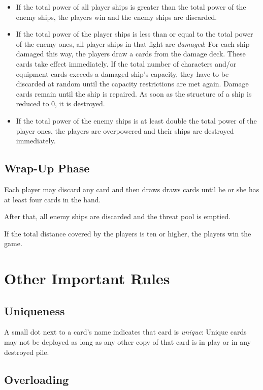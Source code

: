 \documentclass[11pt, a4paper]{article}
\begin{document}
\begin{itemize}
 \item If the total power of all player ships is greater than the total power of
the enemy ships, the players win and the enemy ships are discarded.
 \item If the total power of the player ships is less than or equal to the total
power of the enemy ones, all player ships in that fight are \emph{damaged}: For
each ship damaged this way, the players draw a cards from the damage deck.
These cards take effect immediately. If the total number of characters and/or
equipment cards exceeds a damaged ship's capacity, they have to be discarded at
random until the capacity restrictions are met again. Damage cards remain until
the ship is repaired. As soon as the structure of a ship is reduced to 0, it is
destroyed.
 \item If the total power of the enemy ships is at least double the total power
of the player ones, the players are overpowered and their ships are destroyed
immediately.
\end{itemize}

\subsection{Wrap-Up Phase}

Each player may discard any card and then draws draws cards until he or she has
at least four cards in the hand.

After that, all enemy ships are discarded and the threat pool is emptied.

If the total distance covered by the players is ten or higher, the players win
the game.

\section{Other Important Rules}
\subsection{Uniqueness}

A small dot next to a card's name indicates that card is \emph{unique}: Unique
cards may not be deployed as long as any other copy of that card is in play or
in any destroyed pile.

\subsection{Overloading}
\end{document}
